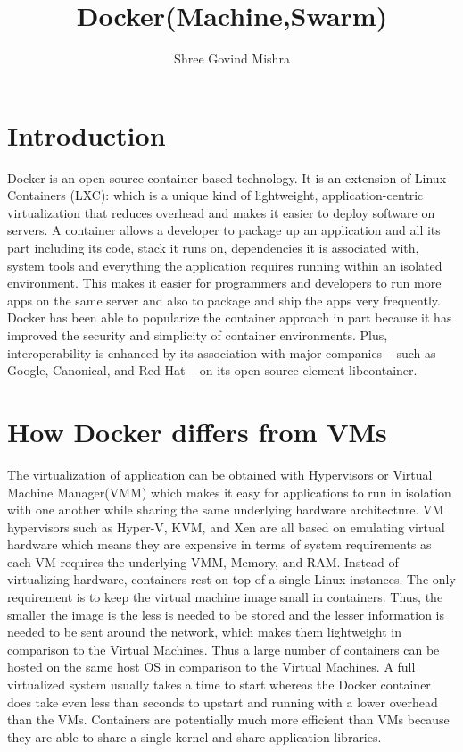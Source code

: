 \documentclass[9pt,twocolumn,twoside]{styles/osajnl}
\title{Docker(Machine,Swarm)}
\author[1]{Shree Govind Mishra}
\affil[1]{School of Informatics and Computing, Bloomington, IN 47408, U.S.A.}
\affil[*]{Corresponding authors:shremish@indiana.edu}
\begin{document}
\maketitle


\section{Introduction}
Docker is an open-source container-based technology. It is an
extension of Linux Containers (LXC): which is a unique kind of
lightweight, application-centric virtualization that reduces overhead
and makes it easier to deploy software on
servers\cite{www-docker-2}. A container allows a developer to package
up an application and all its part including its code, stack it runs
on, dependencies it is associated with, system tools and everything
the application requires running  within an isolated environment. This
makes it easier for programmers and developers to run more apps on the
same server and also to package and ship the apps very frequently.
Docker has been able to popularize the container approach in part
because it has improved the security and simplicity of container
environments. Plus, interoperability is enhanced by its association
with major companies – such as Google, Canonical, and Red Hat – on its
open source element libcontainer.

\section{How Docker differs from VMs}

The virtualization of application can be obtained with Hypervisors or
Virtual Machine Manager(VMM) which makes it easy for applications to
run in isolation with one another while sharing the same
underlying hardware architecture. VM hypervisors such as Hyper-V, KVM,
and Xen are all based on emulating virtual hardware which means they
are expensive in terms of system requirements as each VM requires the
underlying VMM, Memory, and RAM. Instead of virtualizing hardware,
containers rest on top of a single Linux instances. The only
requirement is to keep the virtual machine image small in containers.
Thus, the smaller the image is the less is needed to be stored and the
lesser information is needed to be sent around the network, which
makes them lightweight in comparison to the Virtual Machines. Thus a
large number of containers can be hosted on the same host OS in
comparison to the Virtual Machines. A full virtualized system usually
takes a time to start whereas the Docker container does take even less
than seconds to upstart and running with a lower overhead than the
VMs\cite{www-stackoverflow-docker}.  Containers are potentially much
more efficient than VMs because they are able to share a single kernel
and share application libraries.
\end{document}
